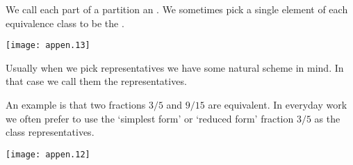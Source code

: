 We call each part of a partition an .%
We sometimes pick a single element of each equivalence class to be the 
.%
\begin{center}
  \texttt{[image: appen.13]}
\end{center}
Usually when we pick representatives we have some natural scheme in mind.
In that case we call them the
 representatives.%
%
%

An example is that
two fractions \( 3/5 \) and \( 9/15 \) are equivalent.
In everyday work we often prefer to use the `simplest form' or `reduced form'
fraction $3/5$ as the class representatives.
\begin{center}
  \texttt{[image: appen.12]}
\end{center}
%
